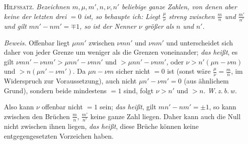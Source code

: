 
\textsc{Hilfssatz.} \textit{Bezeichnen $m,\mu,m',n,\nu,n'$ beliebige ganze Zahlen, von denen aber keine der letzten drei $=0$ ist, so behaupte ich: Liegt $\frac{\mu}{\nu}$ streng zwischen $\frac{m}{n}$ und $\frac{m'}{n'}$ und gilt $mn'-nm'={\mp1}$, so ist der Nenner $\nu$ größer als $n$ und $n'$.}

\textit{Beweis.} Offenbar liegt $\mu nn'$ zwischen $\nu mn'$ und $\nu nm'$ und unterscheidet sich daher von jeder Grenze um weniger als die Grenzen voneinander; \textit{das heißt}, es gilt $\nu mn'-\nu nm'>\mu nn'-\nu mn'$ und $>\mu nn'-\nu nm'$, oder $\nu>n'(\mu n-\nu m)$ und $>n(\mu n'-\nu m')$. Da $\mu n-\nu m$ sicher nicht $=0$ ist (sonst wäre $\frac{\mu}{\nu}=\frac{m}{n}$, im Widerspruch zur Voraussetzung), auch nicht $\mu n'-\nu m'=0$ (aus ähnlichem Grund), sondern beide mindestens $=1$ sind, folgt $\nu>n'$ und $>n$. \textit{W.\,z.\,b.\,w.}

Also kann $\nu$ offenbar nicht $=1$ sein; \textit{das heißt}, gilt $mn'-nm'=\pm1$, so kann zwischen den Brüchen $\frac{m}{n}$, $\frac{m'}{n'}$ keine ganze Zahl liegen. Daher kann auch die Null nicht zwischen ihnen liegen, \textit{das heißt}, diese Brüche können keine entgegengesetzten Vorzeichen haben.
